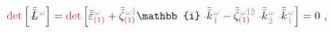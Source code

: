 \begin{subequations}
\begin{align}
	\textcolor{Maroon}{\det} \left[ \Xint{\mathcolor{gray}{-}}{32}{\bar{\bar{L}}}^{\;\! \mathcolor{gray}{\omega}} \right] = \textcolor{Maroon}{\det} \left[ \bar{\bar{\varepsilon}}^{\;\! \mathcolor{gray}{\omega}}_{\textcolor{Maroon}{(1)}} + \bar{\bar{\zeta}}^{\;\! \mathcolor{gray}{\omega} \mathcolor{gray}{\check{1}}}_{\textcolor{Maroon}{(1)}} \mathbb{i} \Xint{\begin{smallmatrix} ~ \\ {}^{}_{\mathcolor{gray}{-}} \\ ~ \end{smallmatrix}}{15}{\bar{\bar{k}}}_{\;\! \mathcolor{gray}{\check{1}}}^{\;\! \mathcolor{gray}{\omega}} - \bar{\bar{\zeta}}^{\;\! \mathcolor{gray}{\omega} \mathcolor{gray}{\check{1} \check{2}}}_{\textcolor{Maroon}{(1)}} \Xint{\begin{smallmatrix} ~ \\ {}^{}_{\mathcolor{gray}{-}} \\ ~ \end{smallmatrix}}{15}{\bar{\bar{k}}}_{\;\! \mathcolor{gray}{\check{2}}}^{\;\! \mathcolor{gray}{\omega}} \Xint{\begin{smallmatrix} ~ \\ {}^{}_{\mathcolor{gray}{-}} \\ ~ \end{smallmatrix}}{15}{\bar{\bar{k}}}_{\;\! \mathcolor{gray}{\check{1}}}^{\;\! \mathcolor{gray}{\omega}} \right] &= 0 ~, \label{eq:nonlinear(2)-wave_wkrho-simplify6-L3}
\end{align}
\end{subequations}
